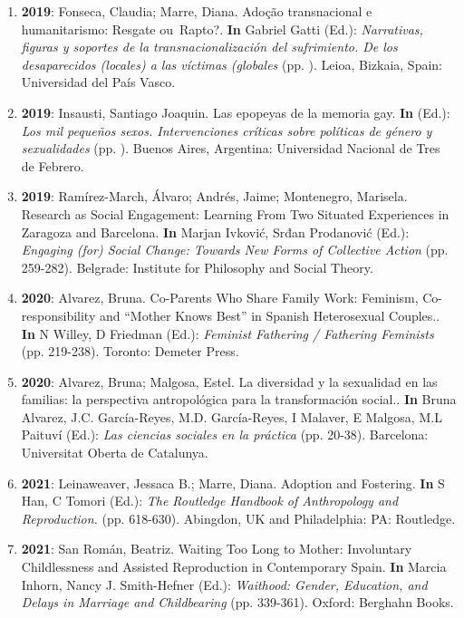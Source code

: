 \begin{enumerate}
\item {\bf 2019}: Fonseca, Claudia; Marre, Diana. Adoção transnacional e humanitarismo: Resgate ou Rapto?. {\bf In} Gabriel Gatti (Ed.): {\it Narrativas, figuras y soportes de la transnacionalización del sufrimiento. De los desaparecidos (locales) a las víctimas (globales} (pp. ). Leioa, Bizkaia, Spain: Universidad del País Vasco. {\bf }\filbreak
\item {\bf 2019}: Insausti, Santiago Joaquin. Las epopeyas de la memoria gay. {\bf In}  (Ed.): {\it Los mil pequeños sexos. Intervenciones críticas sobre políticas de género y sexualidades} (pp. ). Buenos Aires, Argentina: Universidad Nacional de Tres de Febrero. {\bf }\filbreak
\item {\bf 2019}: Ramírez-March, Álvaro; Andrés, Jaime; Montenegro, Marisela. Research as Social Engagement: Learning From Two Situated Experiences in Zaragoza and Barcelona. {\bf In} Marjan Ivković, Srđan Prodanović (Ed.): {\it Engaging (for) Social Change: Towards New Forms of Collective Action} (pp. 259-282). Belgrade: Institute for Philosophy and Social Theory. {\bf }\filbreak
\item {\bf 2020}: Alvarez, Bruna. Co-Parents Who Share Family Work: Feminism, Co-responsibility and “Mother Knows Best” in Spanish Heterosexual Couples.. {\bf In} N Willey, D Friedman (Ed.): {\it Feminist Fathering / Fathering Feminists} (pp. 219-238). Toronto: Demeter Press. {\bf }\filbreak
\item {\bf 2020}: Alvarez, Bruna; Malgosa, Estel. La diversidad y la sexualidad en las familias: la perspectiva antropológica para la transformación social.. {\bf In} Bruna Alvarez, J.C. García-Reyes, M.D. García-Reyes, I Malaver, E Malgosa, M.L Paituví (Ed.): {\it Las ciencias sociales en la práctica} (pp. 20-38). Barcelona: Universitat Oberta de Catalunya. {\bf }\filbreak
\item {\bf 2021}: Leinaweaver, Jessaca B.; Marre, Diana. Adoption and Fostering. {\bf In} S Han, C Tomori (Ed.): {\it The Routledge Handbook of Anthropology and Reproduction.} (pp. 618-630). Abingdon, UK and Philadelphia: PA: Routledge. {\bf }\filbreak
\item {\bf 2021}: San Román, Beatriz. Waiting Too Long to Mother: Involuntary Childlessness and Assisted Reproduction in Contemporary Spain. {\bf In} Marcia Inhorn, Nancy J. Smith-Hefner (Ed.): {\it Waithood: Gender, Education, and Delays in Marriage and Childbearing} (pp. 339-361). Oxford: Berghahn Books. {\bf }\filbreak

\end{enumerate}
